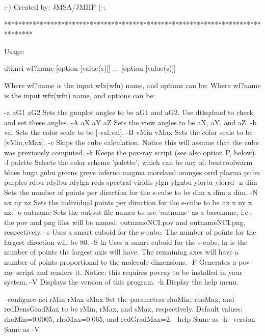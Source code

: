                          :-) Created by: JMSA/JMHP (-:

********************************************************************************


Usage:

	dtknci wf?name [option [value(s)]] ... [option [value(s)]]

Where wf?name is the input wfx(wfn) name, and options can be:
Where wf?name is the input wfx(wfn) name, and options can be:

  -a aG1 aG2	Sets the gnuplot angles to be aG1 and aG2.
            	  Use dtkqdmol to check and set these angles.
  -A aX aY aZ	Sets the view angles to be aX, aY, and aZ.
  -b val    	Sets the color scale to be [-val,val].
  -B vMin vMax	Sets the color scale to be [vMin,vMax].
  -c        	Skips the cube calculation. Notice this will assume that the
            	  cube was previously computed.
  -k        	Keeps the pov-ray script (see also option P, below).
  -l palette	Selects the color scheme 'palette', which can be any of:
            	  bentcoolwarm blues bugn gnbu greens greys inferno
            	  magma moreland oranges orrd plasma pubu purples rdbu
            	  rdylbu rdylgn reds spectral viridis ylgn ylgnbu
            	  ylorbr ylorrd
  -n  dim   	Sets the number of points per direction for the s-cube
            	  to be dim x dim x dim.
  -N nx ny nz	Sets the individual points per direction for the s-cube
            	  to be nx x ny x nz.
  -o outname	Sets the output file names to use 'outname' as a basename,
            	  i.e., the pov and png files will be named:
            	  outnameNCI.pov and outnameNCI.png, respectively.
  -s        	Uses a smart cuboid for the s-cube. The number of points for the
            	  largest direction will be 80.
  -S ln     	Uses a smart cuboid for the s-cube. ln is the number of points
            	  the largest axis will have. The remaining axes will have
            	  a number of points proportional to the molecule dimensions.
  -P        	Generates a pov-ray script and renders it. Notice: this requires
            	   povray to be installed in your system.
  -V        	Displays the version of this program.
  -h		Display the help menu.

  --configure-nci rMin rMax sMax 	Set the parameters rhoMin, rhoMax,
             		  and redDensGradMax to be rMin, rMax, and sMax,
             		  respectively. Default values: rhoMin=0.0005,
             		  rhoMax=0.065, and redGradMax=2.
  --help    		Same as -h
  --version 		Same as -V
